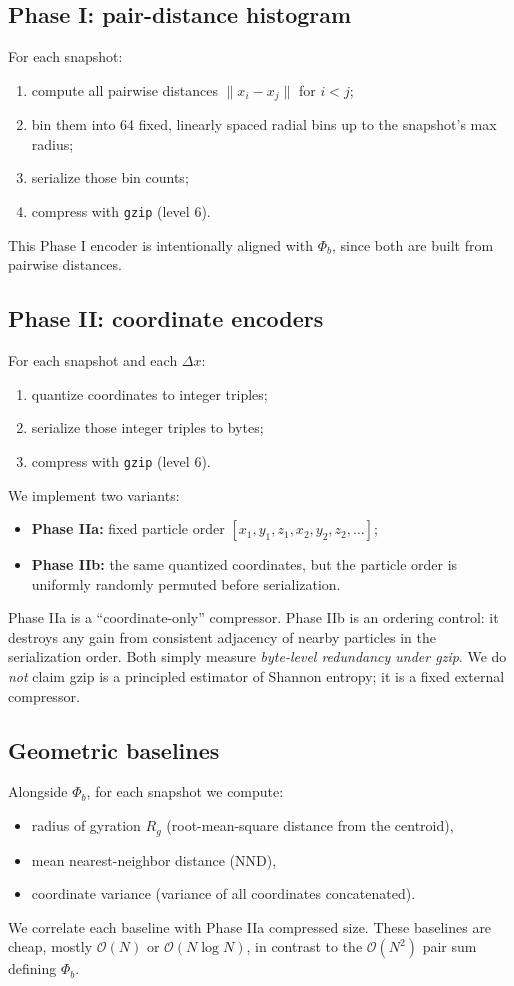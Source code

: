 \documentclass[11pt,a4paper]{article}
\newcommand{\phib}{\Phi_b}
\begin{document}
\subsection{Phase I: pair-distance histogram}
For each snapshot:
\begin{enumerate}
\item compute all pairwise distances $\lVert x_i - x_j \rVert$ for $i{<}j$;
\item bin them into 64 fixed, linearly spaced radial bins up to the snapshot's max radius;
\item serialize those bin counts;
\item compress with \texttt{gzip} (level 6).
\end{enumerate}
This Phase I encoder is intentionally aligned with $\phib$, since both are built from pairwise distances.

\subsection{Phase II: coordinate encoders}
For each snapshot and each $\Delta x$:
\begin{enumerate}
\item quantize coordinates to integer triples;
\item serialize those integer triples to bytes;
\item compress with \texttt{gzip} (level 6).
\end{enumerate}

We implement two variants:
\begin{itemize}
\item \textbf{Phase IIa:} fixed particle order $[x_1,y_1,z_1,x_2,y_2,z_2,\dots]$;
\item \textbf{Phase IIb:} the same quantized coordinates, but the particle order is uniformly randomly permuted before serialization.
\end{itemize}

Phase IIa is a ``coordinate-only'' compressor. Phase IIb is an ordering control: it destroys any gain from consistent adjacency of nearby particles in the serialization order. Both simply measure \emph{byte-level redundancy under gzip}. We do \emph{not} claim gzip is a principled estimator of Shannon entropy; it is a fixed external compressor.

\subsection{Geometric baselines}
Alongside $\phib$, for each snapshot we compute:
\begin{itemize}
\item radius of gyration $R_g$ (root-mean-square distance from the centroid),
\item mean nearest-neighbor distance (NND),
\item coordinate variance (variance of all coordinates concatenated).
\end{itemize}
We correlate each baseline with Phase IIa compressed size. These baselines are cheap, mostly $\mathcal{O}(N)$ or $\mathcal{O}(N\log N)$, in contrast to the $\mathcal{O}(N^2)$ pair sum defining $\phib$.
\end{document}
